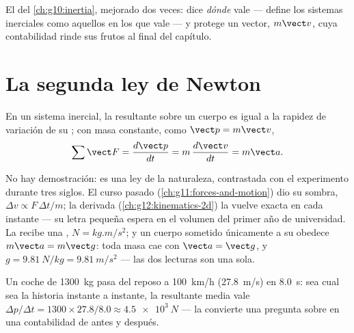 \begin{remark}\label{rem:g12:newtons-laws:sharpened}
El  del \cref{ch:g10:inertia}, mejorado dos veces: dice
\emph{dónde} vale --- define los sistemas inerciales como aquellos en los que vale ---
y protege un vector, $m\vect v$, cuya contabilidad rinde sus frutos al final del
capítulo.
\end{remark}

\section{La segunda ley de Newton}

\begin{theorem}\label{thm:g12:newtons-laws:second}
En un sistema inercial, la  resultante sobre un cuerpo es igual a la rapidez de
variación de su ; con masa constante, como $\vect p = m\vect v$,
\[
\sum \vect F = \frac{d\vect p}{dt} = m\,\frac{d\vect v}{dt} = m \vect a .
\]
\end{theorem}
\admitted

\begin{remark}\label{rem:g12:newtons-laws:nature}
No hay demostración: es una ley de la naturaleza, contrastada con el experimento
durante tres siglos. El curso pasado (\cref{ch:g11:forces-and-motion}) dio su sombra,
$\Delta v \propto F\,\Delta t/m$; la derivada (\cref{ch:g12:kinematics-2d}) la vuelve
exacta en cada instante --- su letra pequeña espera en el volumen del primer año de
universidad. La  recibe una , $\unit{N} = \unit{kg.m/s^2}$; y un cuerpo
sometido únicamente a su  obedece $m\vect a = m\vect g$: toda masa cae con
$\vect a = \vect g$, y $g = \qty{9.81}{N/kg} = \qty{9.81}{m/s^2}$ --- las dos lecturas
son una sola.
\end{remark}

\begin{example}\label{ex:g12:newtons-laws:average}
Un coche de \qty{1300}{kg} pasa del reposo a \qty{100}{km/h} (\qty{27.8}{m/s}) en
\qty{8.0}{s}: sea cual sea la historia instante a instante, la  resultante media
vale $\Delta p/\Delta t = 1300 \times 27.8/8.0 \approx \qty{4.5e3}{N}$ --- la  convierte una pregunta sobre  en una contabilidad de antes y
después.
\end{example}

